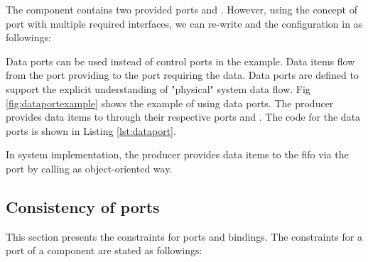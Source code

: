 The  component contains two provided ports  and .
However, using the concept of port with multiple required interfaces, we can re-write  and the configuration in  as followings:

\begin{minipage}{0.95\columnwidth}
	
\end{minipage} 

Data ports can be used instead of control ports in the example.
Data items flow from the port providing to the port requiring the data.
Data ports are defined to support the explicit understanding of "physical" system data flow. 
Fig \ref{fig:dataportexample} shows the example of using data ports.
The  producer provides data items to  through their respective ports  and .
The code for the data ports is shown in Listing \ref{lst:dataport}.

In system implementation, the producer provides data items to the fifo via the port  by calling  as object-oriented way.




\subsection{Consistency of ports}
This section presents the constraints for ports and bindings.
The constraints for a port  of a component  are stated as followings:

		
		
